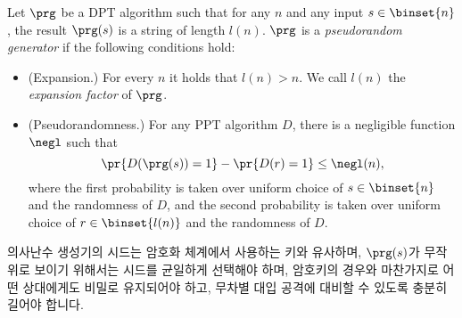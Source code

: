 \begin{definition} \label{def:prg}
    Let $\prg$ be a DPT algorithm such that for any $n$ and any input $s \in \binset{n}$, the result $\prg(s)$ is a string of length $l(n)$. $\prg$ is a \emph{pseudorandom generator} if the following conditions hold:
    \begin{itemize}
        \item (Expansion.) For every $n$ it holds that $l(n) > n$. We call $l(n)$ the \emph{expansion factor} of $\prg$.
        \item (Pseudorandomness.) For any PPT algorithm $D$, there is a negligible function $\negl$ such that
              \begin{equation}
                  \pr{D(\prg(s)) = 1} - \pr{D(r) = 1} \le \negl(n),
              \end{equation}
              where the first probability is taken over uniform choice of $s \in \binset{n}$ and the randomness of $D$, and the second probability is taken over uniform choice of $r \in \binset{l(n)}$ and the randomness of $D$.
    \end{itemize}
\end{definition}

의사난수 생성기의 시드는 암호화 체계에서 사용하는 키와 유사하며, $\prg(s)$가 무작위로 보이기 위해서는 시드를 균일하게 선택해야 하며, 암호키의 경우와 마찬가지로 어떤 상대에게도 비밀로 유지되어야 하고, 무차별 대입 공격에 대비할 수 있도록 충분히 길어야 합니다.



